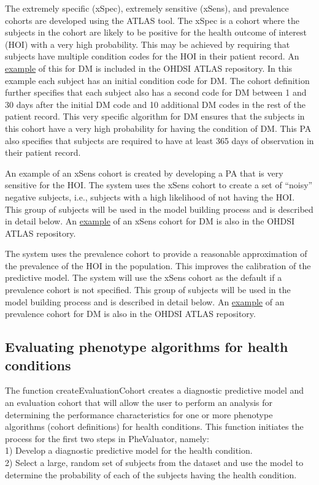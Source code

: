 \documentclass[
]{article}
\begin{document}
The extremely specific (xSpec), extremely sensitive (xSens), and
prevalence cohorts are developed using the ATLAS tool. The xSpec is a
cohort where the subjects in the cohort are likely to be positive for
the health outcome of interest (HOI) with a very high probability. This
may be achieved by requiring that subjects have multiple condition codes
for the HOI in their patient record. An
\href{http://www.ohdsi.org/web/atlas/\#/cohortdefinition/1769699}{example}
of this for DM is included in the OHDSI ATLAS repository. In this
example each subject has an initial condition code for DM. The cohort
definition further specifies that each subject also has a second code
for DM between 1 and 30 days after the initial DM code and 10 additional
DM codes in the rest of the patient record. This very specific algorithm
for DM ensures that the subjects in this cohort have a very high
probability for having the condition of DM. This PA also specifies that
subjects are required to have at least 365 days of observation in their
patient record.

An example of an xSens cohort is created by developing a PA that is very
sensitive for the HOI. The system uses the xSens cohort to create a set
of ``noisy'' negative subjects, i.e., subjects with a high likelihood of
not having the HOI. This group of subjects will be used in the model
building process and is described in detail below. An
\href{http://www.ohdsi.org/web/atlas/\#/cohortdefinition/1770120}{example}
of an xSens cohort for DM is also in the OHDSI ATLAS repository.

The system uses the prevalence cohort to provide a reasonable
approximation of the prevalence of the HOI in the population. This
improves the calibration of the predictive model. The system will use
the xSens cohort as the default if a prevalence cohort is not specified.
This group of subjects will be used in the model building process and is
described in detail below. An
\href{http://www.ohdsi.org/web/atlas/\#/cohortdefinition/1770119}{example}
of an prevalence cohort for DM is also in the OHDSI ATLAS repository.

\hypertarget{evaluating-phenotype-algorithms-for-health-conditions}{%
\subsection{Evaluating phenotype algorithms for health
conditions}\label{evaluating-phenotype-algorithms-for-health-conditions}}

The function createEvaluationCohort creates a diagnostic predictive
model and an evaluation cohort that will allow the user to perform an
analysis for determining the performance characteristics for one or more
phenotype algorithms (cohort definitions) for health conditions. This
function initiates the process for the first two steps in PheValuator,
namely:\\
1) Develop a diagnostic predictive model for the health condition.\\
2) Select a large, random set of subjects from the dataset and use the
model to determine the probability of each of the subjects having the
health condition.
\end{document}
